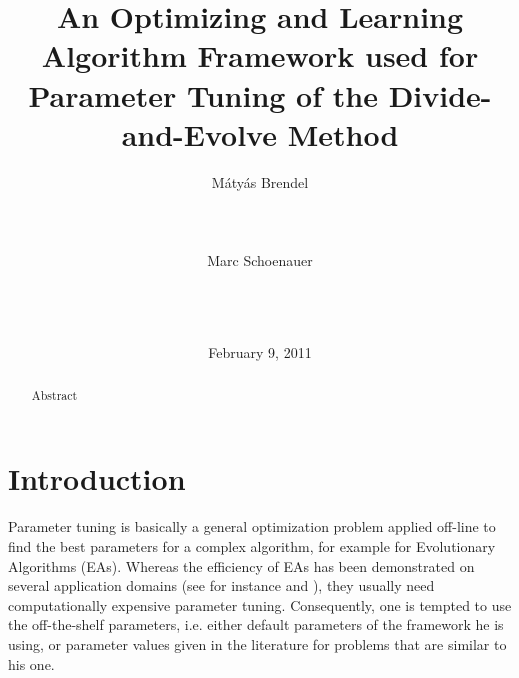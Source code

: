 \documentclass{acm_proc_article-sp}
\begin{document}
\title{An Optimizing and Learning Algorithm Framework used for Parameter Tuning of the Divide-and-Evolve Method}


\author{
\alignauthor
M{\'a}ty{\'a}s Brendel\\
       \\
       \\
       \\
\alignauthor
Marc Schoenauer\\
       \\
       \\
       \\
}

\date{February 9, 2011}
\maketitle
\begin{abstract}
\noindent Abstract
\end{abstract}



\section{Introduction}

Parameter tuning is basically a general optimization problem applied off-line to find the best parameters for a complex algorithm, for example for Evolutionary Algorithms (EAs). Whereas the efficiency of EAs has been demonstrated on several application domains (see for instance \cite{practice08} and \cite{ParameterSettingBook07}), they usually need computationally expensive parameter tuning. Consequently, one is tempted to use the off-the-shelf parameters, i.e. either default parameters of the framework he is using, or parameter values given in the literature for problems that are similar to his one. 
\end{document}
